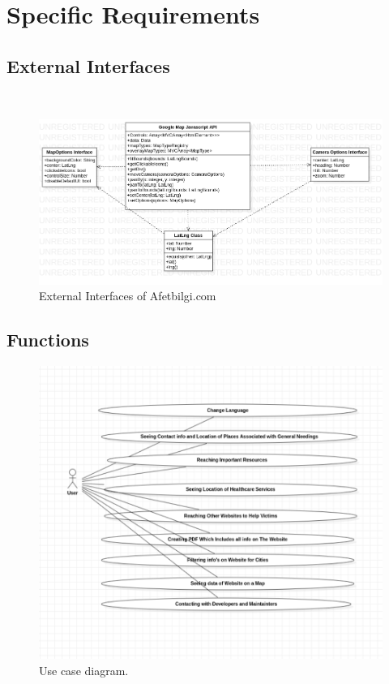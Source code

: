 \chapter{Specific Requirements}

\section{External Interfaces}~\\
\begin{figure}[H]
    \includegraphics[scale = 0.5]{assets/ExternalInterfaces.png}
    \caption[External Interfaces]{External Interfaces of Afetbilgi.com}
\end{figure}
\section{Functions}
\begin{figure}[H]
    \includegraphics[scale=0.5]{assets/UseCaseDiagram.png}
    \caption[Use Case Diagram]{Use case diagram.}
\end{figure}

